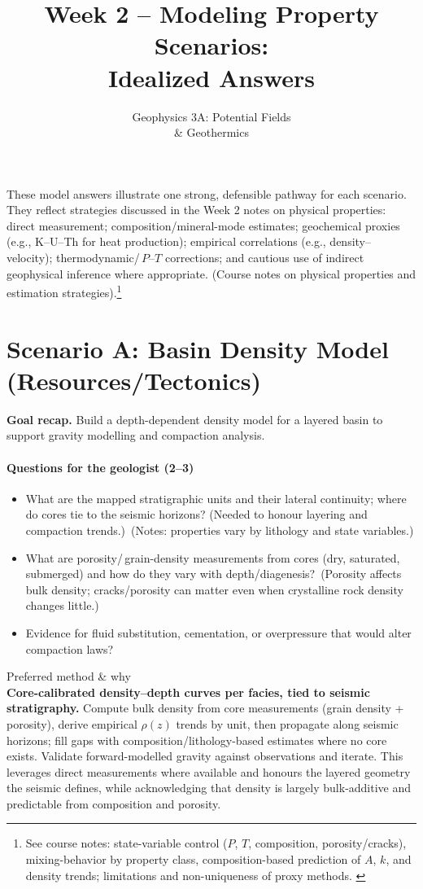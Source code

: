 \documentclass[11pt,a4paper]{article}
\title{Week 2 -- Modeling Property Scenarios:\\Idealized Answers}
\author{Geophysics 3A: Potential Fields \\ \& Geothermics}
\date{}
\begin{document}
\maketitle
These model answers illustrate one strong, defensible pathway for each scenario. They reflect strategies discussed in the Week 2 notes on physical properties: direct measurement; composition/mineral-mode estimates; geochemical proxies (e.g., K--U--Th for heat production); empirical correlations (e.g., density--velocity); thermodynamic/\,$P$--$T$ corrections; and cautious use of indirect geophysical inference where appropriate. (Course notes on physical properties and estimation strategies).\footnote{See course notes: state-variable control ($P$, $T$, composition, porosity/cracks), mixing-behavior by property class, composition-based prediction of $A$, $k$, and density trends; limitations and non-uniqueness of proxy methods.
\label{notesref}}

\section*{Scenario A: Basin Density Model (Resources/Tectonics)}
\textbf{Goal recap.} Build a depth-dependent density model for a layered basin to support gravity modelling and compaction analysis.

\paragraph{Questions for the geologist (2--3)}
\begin{itemize}[leftmargin=*]
  \item What are the mapped stratigraphic units and their lateral continuity; where do cores tie to the seismic horizons? (Needed to honour layering and compaction trends.)~(Notes: properties vary by lithology and state variables.)\label{notesref}
  \item What are porosity/\,grain-density measurements from cores (dry, saturated, submerged) and how do they vary with depth/diagenesis?~(Porosity affects bulk density; cracks/porosity can matter even when crystalline rock density changes little.)\label{notesref}
  \item Evidence for fluid substitution, cementation, or overpressure that would alter compaction laws?
\end{itemize}

Preferred method \& why\\
\textbf{Core-calibrated density--depth curves per facies, tied to seismic stratigraphy.} Compute bulk density from core measurements (grain density + porosity), derive empirical $\rho(z)$ trends by unit, then propagate along seismic horizons; fill gaps with composition/lithology-based estimates where no core exists. Validate forward-modelled gravity against observations and iterate. This leverages direct measurements where available and honours the layered geometry the seismic defines, while acknowledging that density is largely bulk-additive and predictable from composition and porosity.\label{notesref}
\end{document}
